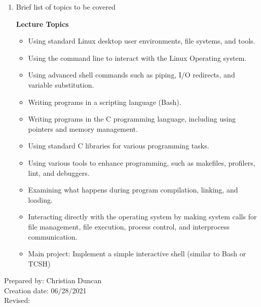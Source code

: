 \begin{enumerate}[1.]
\item Brief list of topics to be covered\\
  {\bfseries
    Lecture Topics
    \begin{itemize}
    \item Using standard Linux desktop user environments, file systems, and tools.
    \item Using the command line to interact with the Linux Operating system.
    \item Using advanced shell commands such as piping, I/O redirects, and variable substitution.
    \item Writing programs in a scripting language (Bash).
    \item Writing programs in the C programming language, including using pointers and memory management.
    \item Using standard C libraries for various programming tasks.
    \item Using various tools to enhance programming, such as makefiles, profilers, lint, and debuggers.
    \item Examining what happens during program compilation, linking, and loading.
    \item Interacting directly with the operating system by making system calls for file management, file execution, process control, and interprocess communication.
    \item Main project: Implement a simple interactive shell (similar to Bash or TCSH)
    \end{itemize}
  }
\end{enumerate}

\noindent Prepared by: Christian Duncan\\
\noindent Creation date: 06/28/2021\\
\noindent Revised:\\
